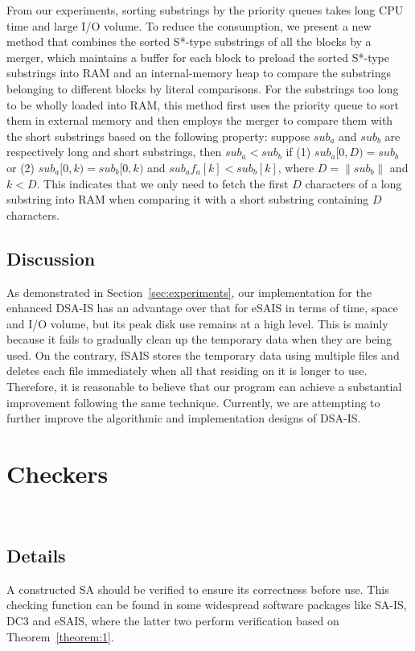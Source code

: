\documentclass[10pt,journal,compsoc]{IEEEtran}
\begin{document}
From our experiments, sorting substrings by the priority queues takes long CPU time and large I/O volume. To reduce the consumption, we present a new method that combines the sorted S*-type substrings of all the blocks by a merger, which maintains a buffer for each block to preload the sorted S*-type substrings into RAM and an internal-memory heap to compare the substrings belonging to different blocks by literal comparisons. For the substrings too long to be wholly loaded into RAM, this method first uses the priority queue to sort them in external memory and then employs the merger to compare them with the short substrings based on the following property: suppose $sub_a$ and $sub_b$ are respectively long and short substrings, then $sub_a < sub_b$ if (1) $sub_a[0, D) = sub_b$ or (2) $sub_a[0, k) = sub_b[0, k)$ and $sub_af_a[k] < sub_b[k]$, where $D = \|sub_b\|$ and $k < D$. This indicates that we only need to fetch the first $D$ characters of a long substring into RAM when comparing it with a short substring containing $D$ characters. 

\subsection{Discussion} \label{subsec:further_discussion}

As demonstrated in Section~\ref{sec:experiments}, our implementation for the enhanced DSA-IS has an advantage over that for eSAIS in terms of time, space and I/O volume, but its peak disk use remains at a high level. This is mainly because it fails to gradually clean up the temporary data when they are being used. On the contrary, fSAIS stores the temporary data using multiple files and deletes each file immediately when all that residing on it is longer to use. Therefore, it is reasonable to believe that our program can achieve a substantial improvement following the same technique. Currently, we are attempting to further improve the algorithmic and implementation designs of DSA-IS. 

\section{Checkers}~\label{sec:check_sa}

\subsection{Details} 

A constructed SA should be verified to ensure its correctness before use. This checking function can be found in some widespread software packages like SA-IS, DC3 and eSAIS, where the latter two perform verification based on Theorem~\ref{theorem:1}.
\end{document}
